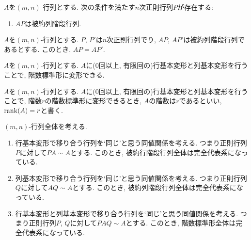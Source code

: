 \begin{prop}
  $A$を$(m,n)$-行列とする.
  次の条件を満たす$n$次正則行列$P$が存在する:
  \begin{enumerate}
    \item $AP$は被約列階段行列.
  \end{enumerate}
\end{prop}

\begin{prop}
  $A$を$(m,n)$-行列とする.
  $P$, $P'$は$n$次正則行列でり,
  $AP$, $AP'$は被約列階段行列であるとする.
  このとき, $AP=AP'$.
\end{prop}

\begin{prop}
  $A$を$(m,n)$-行列とする.
  $A$に($0$回以上, 有限回の)行基本変形と列基本変形を行うことで,
  階数標準形に変形できる.
\end{prop}
\begin{definition}
  $A$を$(m,n)$-行列とする.
  $A$に($0$回以上, 有限回の)行基本変形と列基本変形を行うことで,
  階数$r$の階数標準形に変形できるとき,
  $A$の階数は$r$であるといい,
  $\operatorname{rank}(A)=r$と書く.
\end{definition}

\begin{remark}
  $(m,n)$-行列全体を考える.
  \begin{enumerate}
  \item
    行基本変形で移り合う行列を`同じ'と思う同値関係を考える.
    つまり正則行列$P$に対して$PA\sim A$とする.
    このとき, 被約行階段行列全体は完全代表系になっている.
  \item
    列基本変形で移り合う行列を`同じ'と思う同値関係を考える.
    つまり正則行列$Q$に対して$AQ\sim A$とする.
    このとき, 被約列階段行列全体は完全代表系になっている.
   \item
    行基本変形と列基本変形で移り合う行列を`同じ'と思う同値関係を考える.
    つまり正則行列$P$, $Q$に対して$PAQ\sim A$とする.
    このとき, 階数標準形全体は完全代表系になっている.
  \end{enumerate}
\end{remark}

